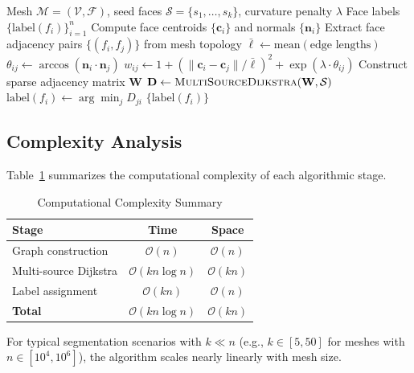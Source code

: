 \begin{algorithm}[H]
\caption{Angle-Aware Geodesic Voronoi Segmentation}
\label{alg:full_segmentation}
\begin{algorithmic}[1]
\Require Mesh $\mathcal{M} = (\mathcal{V}, \mathcal{F})$, seed faces $\mathcal{S} = \{s_1, \ldots, s_k\}$, curvature penalty $\lambda$
\Ensure Face labels $\{\text{label}(f_i)\}_{i=1}^n$
\State Compute face centroids $\{\mathbf{c}_i\}$ and normals $\{\mathbf{n}_i\}$
\State Extract face adjacency pairs $\{(f_i, f_j)\}$ from mesh topology
\State $\bar{\ell} \gets \text{mean}(\text{edge lengths})$
    \State $\theta_{ij} \gets \arccos(\mathbf{n}_i \cdot \mathbf{n}_j)$
    \State $w_{ij} \gets 1 + (\|\mathbf{c}_i - \mathbf{c}_j\|/\bar{\ell})^2 + \exp(\lambda \cdot \theta_{ij})$
\EndFor
\State Construct sparse adjacency matrix $\mathbf{W}$
\State $\mathbf{D} \gets \textsc{MultiSourceDijkstra}(\mathbf{W}, \mathcal{S})$
    \State $\text{label}(f_i) \gets \arg\min_j D_{ji}$
\EndFor
\State \Return $\{\text{label}(f_i)\}$
\end{algorithmic}
\end{algorithm}

\subsection{Complexity Analysis}

Table~\ref{tab:complexity} summarizes the computational complexity of each algorithmic stage.

\begin{table}[h]
\centering
\caption{Computational Complexity Summary}
\label{tab:complexity}
\begin{tabular}{lcc}
\toprule
\textbf{Stage} & \textbf{Time} & \textbf{Space} \\
\midrule
Graph construction & $\mathcal{O}(n)$ & $\mathcal{O}(n)$ \\
Multi-source Dijkstra & $\mathcal{O}(kn \log n)$ & $\mathcal{O}(kn)$ \\
Label assignment & $\mathcal{O}(kn)$ & $\mathcal{O}(n)$ \\
\midrule
\textbf{Total} & $\mathcal{O}(kn \log n)$ & $\mathcal{O}(kn)$ \\
\bottomrule
\end{tabular}
\end{table}

For typical segmentation scenarios with $k \ll n$ (e.g., $k \in [5, 50]$ for meshes with $n \in [10^4, 10^6]$), the algorithm scales nearly linearly with mesh size.

